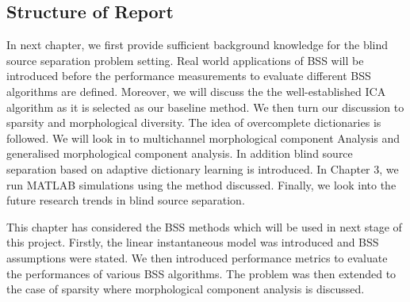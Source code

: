 \subsection{Structure of Report}
In next chapter, we first provide sufficient background knowledge for the blind source separation problem setting. Real world applications of BSS will be introduced before the performance measurements to evaluate different BSS algorithms are defined. Moreover, we will discuss the the well-established ICA algorithm as it is selected as our baseline method. We then turn our discussion to sparsity and morphological diversity. The idea of overcomplete dictionaries is followed. We will look in to multichannel morphological component Analysis and generalised morphological component analysis. In addition blind source separation based on adaptive dictionary learning is introduced. In Chapter 3, we run MATLAB simulations using the method discussed. Finally, we look into the future research trends in blind source separation.


This chapter has considered the BSS methods which will be used in next stage of this project. Firstly, the linear instantaneous model was introduced and BSS assumptions were stated. We then introduced performance metrics to evaluate the performances of various BSS algorithms. The problem was then extended to the case of sparsity where morphological component analysis is discussed. 